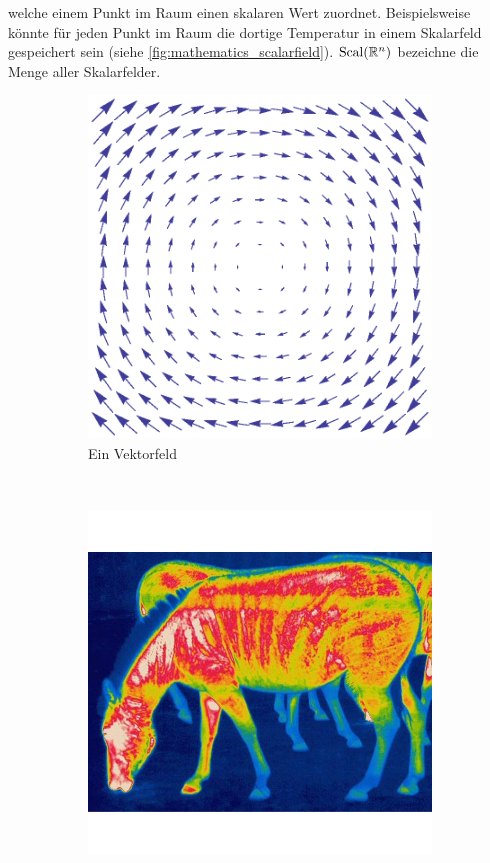 welche einem Punkt im Raum einen skalaren Wert zuordnet. Beispielsweise könnte
für jeden Punkt im Raum die dortige Temperatur in einem Skalarfeld gespeichert
sein (siehe \autoref{fig:mathematics_scalarfield}).
$\operatorname*{Scal}(\mathbb{R}^n)$ bezeichne die Menge aller Skalarfelder.

\begin{figure}
	\begin{subfigure}[b]{0.5\textwidth}
		\centering
		\includegraphics[width=\textwidth]{images/vectorfield}
		\caption{Ein Vektorfeld}
		\label{fig:mathematics_vectorfield}
	\end{subfigure}
	~
	\begin{subfigure}[b]{0.5\textwidth}
		\centering
		\includegraphics[width=\textwidth]{images/thermal_imaging}

\end{subfigure}
\end{figure}
